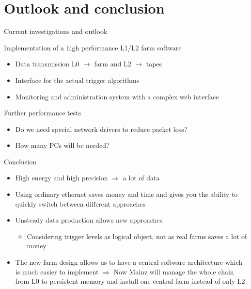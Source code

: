 \section{Outlook and conclusion}
\begin{frame}{Current investigations and outlook}{}
	\begin{block}{Implementation of a high performance L1/L2 farm software }
		\begin{itemize}
		  \item Data transmission L0 $\rightarrow$ farm and L2 $\rightarrow$ tapes
		  \item Interface for the actual trigger algorithms
		  \item Monitoring and administration system with a complex web interface
		\end{itemize}
	\end{block}
	
	\begin{block}{Further performance tests}
		\begin{itemize}
		  \item Do we need special network drivers to reduce packet loss?
		  \item How many PCs will be needed?
		\end{itemize}
	\end{block}
\end{frame}

\begin{frame}{Conclusion}{}
	\begin{itemize}
	\item High energy and high precision $\Rightarrow$ a lot of data
	\item Using ordinary ethernet saves money and time and gives you the ability
		to quickly switch between different approaches
	\item Unsteady data production allows new approaches
	 	 \begin{itemize}
		  \item Considering trigger levels as logical object, not as real farms saves
		  a lot of money
		\end{itemize}
	\item The new farm design allows us to have a central software architecture
	which is much easier to implement $\Rightarrow$ Now Mainz will manage the
	whole chain from L0 to persistent memory and install one central farm instead
	of only L2
	\end{itemize}
\end{frame}
